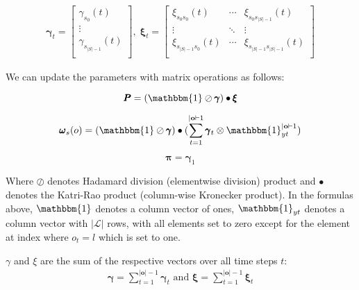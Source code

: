\begin{align}
\pmb{\gamma}_t = 
    \begin{bmatrix}
        \gamma_{s_0}(t)       \\
        \vdots                \\
        \gamma_{s_{|S|-1}}(t) \\
    \end{bmatrix}, \;
\pmb{\xi}_t = 
    \begin{bmatrix}
        \xi_{s_0 s_0}(t)      & \cdots & \xi_{s_0 s_{|S|-1}}(t)      \\
        \vdots                & \ddots & \vdots                      \\
        \xi_{s_{|S|-1}s_0}(t) & \cdots & \xi_{s_{|S|-1}s_{|S|-1}}(t) \\
    \end{bmatrix}
\end{align}

We can update the parameters with matrix operations as follows:

\begin{equation}
\pmb{P}
    = (\mathbbm{1} \oslash \pmb{\gamma}) \bullet \pmb{\xi}
    \label{eq:transition-probabilities-update}
\end{equation}

\begin{equation}
\pmb{\omega}
    _s(o) = (\mathbbm{1} \oslash \pmb{\gamma}) \bullet (\sum_{t=1}^{|\mathbf{o}|-1} \pmb{\gamma}_t \otimes \mathbbm{1}_{yt}^{|\mathbf{o}|-1})
    \label{eq:omega-update}
\end{equation}

\begin{equation}
\pmb{\pi}
    = \pmb{\gamma}_1
    \label{eq:initial-probabilities-update}
\end{equation}

Where $\oslash$ denotes Hadamard division (elementwise division) product and $\bullet$ denotes the Katri-Rao product (column-wise Kronecker product).
In the formulas above, $\mathbbm{1}$ denotes a column vector of ones, $\mathbbm{1}_{yt}$ denotes a column vector with $|\mathcal{L}|$ rows, with all elements set to zero except for the element at index where $o_t = l$ which is set to one.

$\gamma$ and $\xi$ are the sum of the respective vectors over all time steps $t$:
\begin{align}
    \pmb{\gamma} = \sum_{t=1}^{|\mathbf{o}|-1} \pmb{\gamma}_t 
    \text{ and } 
    \pmb{\xi} = \sum_{t=1}^{|\mathbf{o}|-1} \pmb{\xi}_t
\end{align} 

